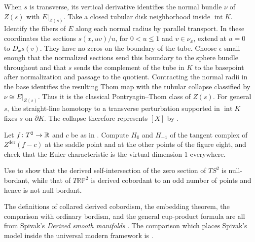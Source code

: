 When $s$ is transverse, its vertical derivative identifies the normal
bundle $\nu$ of $Z(s)$ with $E|_{Z(s)}$. Take a closed tubular disk
neighborhood inside $\operatorname{int}K$. Identify the fibers of $E$
along each normal radius by parallel transport. In these coordinates the
sections $s(x,uv)/u$, for $0<u\le1$ and $v\in\nu_x$, extend at $u=0$
to $D_xs(v)$. They have no zeros on the boundary of the tube. Choose
$\epsilon$ small enough that the normalized sections send this boundary
to the sphere bundle throughout and that $s$ sends the complement of the
tube in $K$ to the basepoint after normalization and passage to the
quotient. Contracting the normal radii in the base identifies the
resulting Thom map with the tubular collapse classified by
$\nu\cong E|_{Z(s)}$. Thus it is the classical Pontryagin--Thom class of
$Z(s)$. For general $s$, the straight-line homotopy to a transverse
perturbation supported in $\operatorname{int}K$ fixes $s$ on $\partial K$.
The collapse therefore represents $[X]$ by
.

\begin{exercise}
  Let $f\colon T^2\to\mathbb{R}$ and $c$ be as in
  . Compute $H_0$ and $H_{-1}$ of the
  tangent complex of $Z^{\mathrm{der}}(f-c)$ at the saddle point and at the
  other points of the figure eight, and check that the Euler characteristic
  is the virtual dimension $1$ everywhere.
\end{exercise}

\begin{exercise}
  Use  to show that
  the derived self-intersection of the zero section of $TS^2$ is null-bordant,
  while that of $T\mathbb{RP}^2$ is derived cobordant to an odd number of
  points and hence is not null-bordant.
\end{exercise}

The definitions of collared derived cobordism, the embedding theorem, the
comparison with ordinary bordism, and the general cup-product formula are all
from Spivak's \emph{Derived smooth manifolds}
\cite[Sections~1--3]{Spivak_Derived_Smooth_Manifolds}. The comparison which
places Spivak's model inside the universal modern framework is
\citet[Section~5.2]{Carchedi_Steffens_Universal_Derived_Manifolds}.
